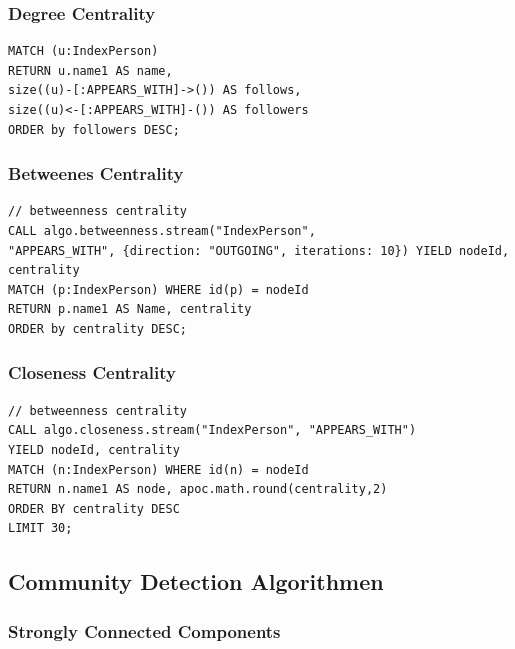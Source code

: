 \hypertarget{degree-centrality}{%
\subsubsection{Degree Centrality}\label{degree-centrality}}

\begin{verbatim}
MATCH (u:IndexPerson)
RETURN u.name1 AS name,
size((u)-[:APPEARS_WITH]->()) AS follows,
size((u)<-[:APPEARS_WITH]-()) AS followers
ORDER by followers DESC;
\end{verbatim}

\hypertarget{betweenes-centrality}{%
\subsubsection{Betweenes Centrality}\label{betweenes-centrality}}

\begin{verbatim}
// betweenness centrality
CALL algo.betweenness.stream("IndexPerson",
"APPEARS_WITH", {direction: "OUTGOING", iterations: 10}) YIELD nodeId, centrality
MATCH (p:IndexPerson) WHERE id(p) = nodeId
RETURN p.name1 AS Name, centrality
ORDER by centrality DESC;
\end{verbatim}

\hypertarget{closeness-centrality}{%
\subsubsection{Closeness Centrality}\label{closeness-centrality}}

\begin{verbatim}
// betweenness centrality
CALL algo.closeness.stream("IndexPerson", "APPEARS_WITH")
YIELD nodeId, centrality
MATCH (n:IndexPerson) WHERE id(n) = nodeId
RETURN n.name1 AS node, apoc.math.round(centrality,2)
ORDER BY centrality DESC
LIMIT 30;
\end{verbatim}

\hypertarget{community-detection-algorithmen}{%
\subsection{Community Detection
Algorithmen}\label{community-detection-algorithmen}}

\hypertarget{strongly-connected-components}{%
\subsubsection{Strongly Connected
Components}\label{strongly-connected-components}}

